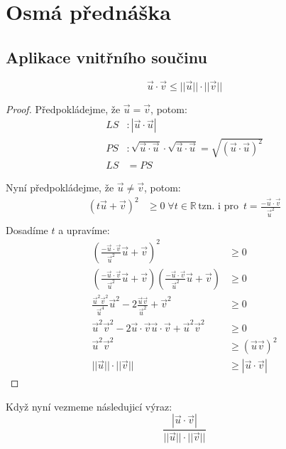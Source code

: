 \section{Osmá přednáška}
\subsection{Aplikace vnitřního součinu}

\begin{theorem}
    $$\vec{u} \cdot \vec{v} \leq ||\vec{u}|| \cdot ||\vec{v}||$$
\end{theorem}
\begin{proof}
    Předpokládejme, že $\vec{u} = \vec{v}$, potom:
    \begin{align*}
        LS&: |\vec{u} \cdot \vec{u}|\\
        PS&: \sqrt{\vec{u} \cdot \vec{u}} \cdot \sqrt{\vec{u} \cdot \vec{u}}
            = \sqrt{(\vec{u} \cdot \vec{u})^2}\\
        LS &= PS
    \end{align*}

    Nyní předpokládejme, že $\vec{u} \neq \vec{v}$, potom:
    \begin{align*}
        (t \vec{u} + \vec{v})^2 &\geq 0\; \forall t \in \mathbb{R}\, \text{tzn. i pro }\,
            t= \frac{-\vec{u} \cdot \vec{v}}{\vec{u}^2}\\
    \end{align*}
    Dosadíme $t$ a upravíme:
    \begin{align*}
        (\frac{-\vec{u} \cdot \vec{v}}{\vec{u}^2} \vec{u} + \vec{v})^2 &\geq 0\\
        (\frac{-\vec{u} \cdot \vec{v}}{\vec{u}^2} \vec{u} + \vec{v})
            (\frac{-\vec{u} \cdot \vec{v}}{\vec{u}^2} \vec{u} + \vec{v}) &\geq 0\\
        \frac{\vec{u}^2 \vec{v}^2}{\vec{u}^4} \vec{u}^2 - 2\frac{\vec{u}\vec{v}}{\vec{u}^2} +
            \vec{v}^2 &\geq 0\\
        \vec{u}^2\vec{v}^2 - 2\vec{u}\cdot \vec{v}\vec{u} \cdot \vec{v} + \vec{u}^2\vec{v}^2 &\geq 0\\
        \vec{u}^2\vec{v}^2 &\geq (\vec{u} \vec{v})^2\\
        ||\vec{u}|| \cdot ||\vec{v}|| &\geq |\vec{u} \cdot \vec{v}|
    \end{align*}
\end{proof}

Když nyní vezmeme následujicí výraz:
$$\frac{|\vec{u} \cdot \vec{v}|}
{||\vec{u}|| \cdot||\vec{v}||}$$


